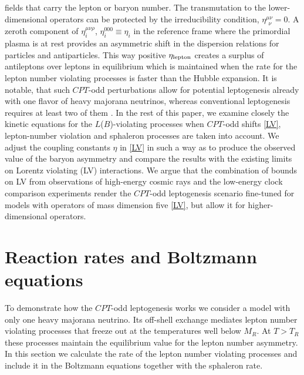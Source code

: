 \documentclass[12pt]{revtex4}
\begin{document}
	fields that carry the lepton or baryon number. The transmutation to the lower-dimensional 
	operators can be protected by the irreducibility condition, $\eta^{\mu\nu}_{~~\nu}=0$.
	A zeroth component of $ \eta_i^{\mu\nu\rho} $, $ \eta_i^{000} \equiv \eta_i $ in the 
reference frame where the primordial plasma is at rest provides 
	an asymmetric shift in the dispersion relations for particles and antiparticles.
    This way positive $\eta_{\rm lepton}$ creates a surplus of antileptons over leptons 
    in equilibrium which is maintained when the rate for the
lepton number violating processes is faster than the Hubble expansion.
	It is notable, that such $CPT$-odd perturbations allow for potential leptogenesis already
	with one flavor of heavy majorana neutrinos, whereas conventional leptogenesis requires
	at least two of them \cite{Fukugita:1986hr}.
	In the rest of this paper, we examine closely the kinetic equations for the 
    $L$($B$)-violating processes when $CPT$-odd shifts \eqref{LV}, lepton-number violation and 
    sphaleron processes are taken into account. 
	We adjust the coupling constants $ \eta $ in \eqref{LV} in such a way as to produce 
	the observed value of the baryon asymmetry and compare the results with the existing
	limits on Lorentz violating (LV) interactions. 
	We argue that the combination of bounds on LV from observations of high-energy cosmic rays
\cite{Gagnon:2004xh} and the low-energy clock comparison experiments
render the $CPT$-odd leptogenesis scenario fine-tuned  for models with operators of 
	mass dimension five \eqref{LV}, but allow it for higher-dimensional operators.
	

%
%
\section{Reaction rates and Boltzmann equations}
\label{rates}

	To demonstrate how the $CPT$-odd leptogenesis works we consider a model with only one heavy 
majorana neutrino. Its off-shell exchange mediates lepton number violating processes that 
	freeze out at the temperatures well below $ M_R $.
	At $ T > T_R $ these processes maintain the equilibrium value for the
	lepton number asymmetry. 
	In this section we calculate the rate of the lepton number violating processes and include it
	in the Boltzmann equations together with the sphaleron rate.
	
\end{document}
